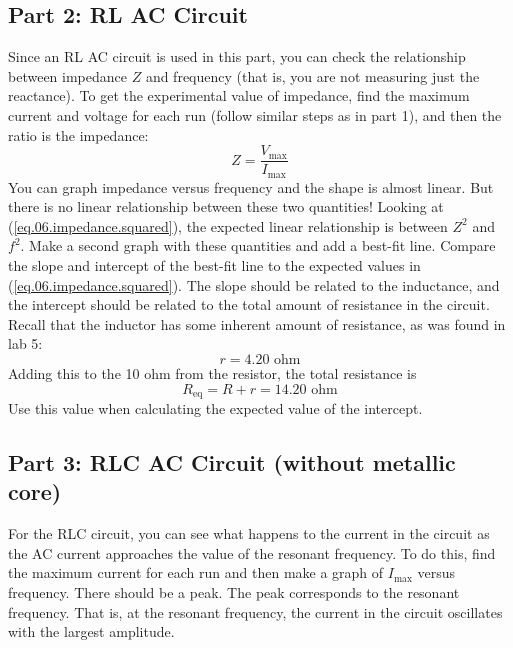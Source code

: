 \subsection{Part 2: RL AC Circuit}
Since an RL AC circuit is used in this part, you can check the relationship between impedance $Z$ and frequency (that is, you are not measuring just the reactance). To get the experimental value of impedance, find the maximum current and voltage for each run (follow similar steps as in part 1), and then the ratio is the impedance:
\begin{equation}
	Z = \frac{V_{\text{max}}}{I_{\text{max}}}
\end{equation}
You can graph impedance versus frequency and the shape is almost linear. But there is no linear relationship between these two quantities! Looking at (\ref{eq.06.impedance.squared}), the expected linear relationship is between $Z^{2}$ and $f^{2}$. Make a second graph with these quantities and add a best-fit line. Compare the slope and intercept of the best-fit line to the expected values in (\ref{eq.06.impedance.squared}). The slope should be related to the inductance, and the intercept should be related to the total amount of resistance in the circuit. Recall that the inductor has some inherent amount of resistance, as was found in lab 5:
\begin{equation}
	r = 4.20 \text{ ohm}
\end{equation}
Adding this to the 10 ohm from the resistor, the total resistance is
\begin{equation}
	R_{\text{eq}} = R + r = 14.20 \text{ ohm}
\end{equation}
Use this value when calculating the expected value of the intercept.
\subsection{Part 3: RLC AC Circuit (without metallic core)}
For the RLC circuit, you can see what happens to the current in the circuit as the AC current approaches the value of the resonant frequency. To do this, find the maximum current for each run and then make a graph of $I_{\text{max}}$ versus frequency. There should be a peak. The peak corresponds to the resonant frequency. That is, at the resonant frequency, the current in the circuit oscillates with the largest amplitude.

